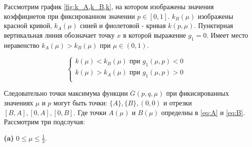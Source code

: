 \begin{flushleft}
	Рассмотрим график \ref{fig:k_A,k_B,k}, на котором изображены значения коэффициетов
	при фиксированном значении $p \in [0,1]$. $k_B(\mu)$ изображены красной кривой,
	$k_A(\mu)$ синей и фиолетовой - кривая $k(p, \mu)$. Пунктирная вертикальная линия
	обозначает точку $x$ в которой выражение $g_1=0$. Имеет место неравенство 
	$k_A(\mu) > k_B(\mu)$ при $\mu \in (0,1)$.
	
	$$
	\begin{cases}
	k(\mu) < k_B(\mu) \textrm{ при } g_1(\mu,p) < 0  \\
	k(\mu) > k_A(\mu) \textrm{ при } g_1(\mu,p) > 0 \\
	\end{cases}		
	$$	
	
	
	Следовательно точки максимума функции $\overline{G}(p,q,\mu)$ при фикисированных
	значениях $\mu$ и $p$ могут быть точки: 
	$\{A\}, \{B\}, (0,0)$ и отрезки $[B, A], [0, A], [0,B]$. Где точки
	$A(\mu)$ и $B(\mu)$ определны в \ref{eq:A} и \ref{eq:B}. 
	Рассмотрим три подслучая:
	
	\newpage

	\textbf{(a)} $0 \leqslant \mu \leqslant \frac{1}{3}$. 	
		

\end{flushleft}
